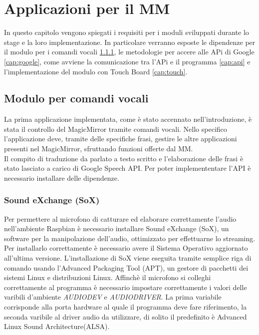 \chapter{Applicazioni per il MM}\label{capitolo4}
In questo capitolo vengono spiegati i requisiti per i moduli sviluppati durante lo stage e la loro implementazione.
In particolare verranno esposte le dipendenze per il modulo per i comandi vocali \ref{cap:sox}, le metodologie
per accere alle APi di Google \ref{cap:google}, come avviene la comunicazione tra l'APi e il programma \ref{cap:api}
e l'implementazione del modulo con Touch Board \ref{cap:touch}.

\section{Modulo per comandi vocali}\label{cap:voce}
La prima applicazione implementata, come \`e stato accennato nell'introduzione, \`e
stata il controllo del MagicMirror tramite comandi vocali.
Nello specifico l'applicazione deve, tramite delle specifiche frasi,
gestire le altre applicazioni presenti nel MagicMirror, sfruttando funzioni offerte dal MM.\\
Il compito di traduzione da parlato a testo scritto e l'elaborazione delle frasi \`e stato
lasciato a carico di Google Speech API.
Per poter implemententare l'API \`e necessario installare delle dipendenze.

\subsection{Sound eXchange (SoX)}\label{cap:sox}
Per permettere al microfono di catturare ed elaborare correttamente l'audio nell'ambiente
Raspbian \`e necessario installare Sound eXchange (SoX), un software per la manipolazione
dell'audio, ottimizzato per effettuarne lo streaming.
Per installarlo correttamente \`e necessario avere il Sistema Operativo aggiornato all'ultima versione.
L'installazione di SoX viene eseguita tramite semplice riga di comando usando l'Advanced Packaging Tool (APT),
un gestore di pacchetti dei sistemi Linux e distribuzioni Linux.
Affinch\`e il microfono si colleghi correttamente al programma \`e necessario impostare correttamente
i valori delle varibili d'ambiente \textit{AUDIODEV} e \textit{AUDIODRIVER}.
La prima variabile corrisponde alla porta hardware al quale il programma deve fare riferimento,
la seconda varibile al driver audio da utilizzare, di solito il predefinito \`e Advanced Linux Sound Architecture(ALSA).

